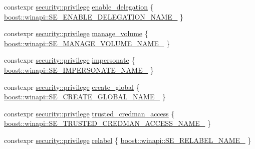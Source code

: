 \begin{DoxyCompactItemize}
\item 
constexpr \mbox{\hyperlink{classdistant_1_1security_1_1privilege}{security\+::privilege}} \mbox{\hyperlink{namespacedistant_1_1security_1_1privileges_a7cbe923150bc5a0a4f73fc8a657c8f29}{enable\+\_\+delegation}} \{ \mbox{\hyperlink{namespaceboost_1_1winapi_a322e9c095674d9de8eb98871c9e016cc}{boost\+::winapi\+::\+S\+E\+\_\+\+E\+N\+A\+B\+L\+E\+\_\+\+D\+E\+L\+E\+G\+A\+T\+I\+O\+N\+\_\+\+N\+A\+M\+E\+\_\+}} \}
\item 
constexpr \mbox{\hyperlink{classdistant_1_1security_1_1privilege}{security\+::privilege}} \mbox{\hyperlink{namespacedistant_1_1security_1_1privileges_ad14bfbef73e500187405f41852199ea6}{manage\+\_\+volume}} \{ \mbox{\hyperlink{namespaceboost_1_1winapi_a373ba0c67213053cc59e416ce2b88b3c}{boost\+::winapi\+::\+S\+E\+\_\+\+M\+A\+N\+A\+G\+E\+\_\+\+V\+O\+L\+U\+M\+E\+\_\+\+N\+A\+M\+E\+\_\+}} \}
\item 
constexpr \mbox{\hyperlink{classdistant_1_1security_1_1privilege}{security\+::privilege}} \mbox{\hyperlink{namespacedistant_1_1security_1_1privileges_a264a4063769257ce019ee2f470e2eddc}{impersonate}} \{ \mbox{\hyperlink{namespaceboost_1_1winapi_aef9bc7ae4469ce3ab33233067ea1fd5a}{boost\+::winapi\+::\+S\+E\+\_\+\+I\+M\+P\+E\+R\+S\+O\+N\+A\+T\+E\+\_\+\+N\+A\+M\+E\+\_\+}} \}
\item 
constexpr \mbox{\hyperlink{classdistant_1_1security_1_1privilege}{security\+::privilege}} \mbox{\hyperlink{namespacedistant_1_1security_1_1privileges_a2a87cff7c67e6c1e29b4ecd3380210d7}{create\+\_\+global}} \{ \mbox{\hyperlink{namespaceboost_1_1winapi_a66aeb4ef7086d623c9891dfcbb82bbd9}{boost\+::winapi\+::\+S\+E\+\_\+\+C\+R\+E\+A\+T\+E\+\_\+\+G\+L\+O\+B\+A\+L\+\_\+\+N\+A\+M\+E\+\_\+}} \}
\item 
constexpr \mbox{\hyperlink{classdistant_1_1security_1_1privilege}{security\+::privilege}} \mbox{\hyperlink{namespacedistant_1_1security_1_1privileges_ab3ef76716fb9df03cbf951909d828001}{trusted\+\_\+credman\+\_\+access}} \{ \mbox{\hyperlink{namespaceboost_1_1winapi_a2f5b02608b721efadf8d8dc36ca6ee47}{boost\+::winapi\+::\+S\+E\+\_\+\+T\+R\+U\+S\+T\+E\+D\+\_\+\+C\+R\+E\+D\+M\+A\+N\+\_\+\+A\+C\+C\+E\+S\+S\+\_\+\+N\+A\+M\+E\+\_\+}} \}
\item 
constexpr \mbox{\hyperlink{classdistant_1_1security_1_1privilege}{security\+::privilege}} \mbox{\hyperlink{namespacedistant_1_1security_1_1privileges_ac582f9f81e347f6032910440996e3051}{relabel}} \{ \mbox{\hyperlink{namespaceboost_1_1winapi_ac0b494d146c544a2a50663fc0347e25a}{boost\+::winapi\+::\+S\+E\+\_\+\+R\+E\+L\+A\+B\+E\+L\+\_\+\+N\+A\+M\+E\+\_\+}} \}

\end{DoxyCompactItemize}
